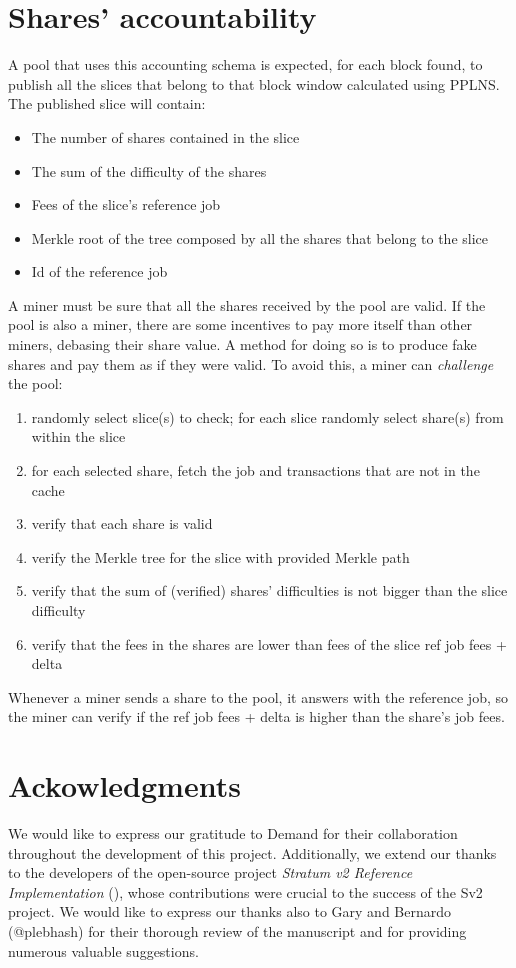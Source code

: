 \documentclass[10pt]{article}
\begin{document}
\section{Shares' accountability}
A pool that uses this accounting schema is expected, for each block found, to publish all the slices that belong to that block window calculated using PPLNS. The published slice will contain:
\begin{itemize}
	\item The number of shares contained in the slice
	\item The sum of the difficulty of the shares
	\item Fees of the slice's reference job
	\item Merkle root of the tree composed by all the shares that belong to the slice
	\item Id of the reference job
\end{itemize}
A miner must be sure that all the shares received by the pool are valid. If the pool is also a miner, there are some incentives to pay more itself than other miners, debasing their share value. A method for doing so is to produce fake shares and pay them as if they were valid. To avoid this, a miner can \emph{challenge} the pool:
\begin{enumerate}
	\item randomly select slice(s) to check; for each slice randomly select share(s) from within the slice
	\item for each selected share, fetch the job and transactions that are not in the cache 
	\item verify that each share is valid
	\item verify the Merkle tree for the slice with provided Merkle path
	\item verify that the sum of (verified) shares' difficulties is not bigger than the slice difficulty
	\item verify that the fees in the shares are lower than fees of the slice ref job fees + delta
	
\end{enumerate}
 
Whenever a miner sends a share to the pool, it answers with the  reference job, so the miner can verify if the ref job fees + delta is higher than the share's job fees.

\section*{Ackowledgments}
We would like to express our gratitude to Demand \cite{demand} for their collaboration throughout the development of this project. Additionally, we extend our thanks to the developers of the open-source project \emph{Stratum v2 Reference Implementation} (\cite{sv2}), whose contributions were crucial to the success of the Sv2 project.
We would like to express our thanks also to Gary and Bernardo (@plebhash) for their thorough review of the manuscript and for providing numerous valuable suggestions.
\end{document}

